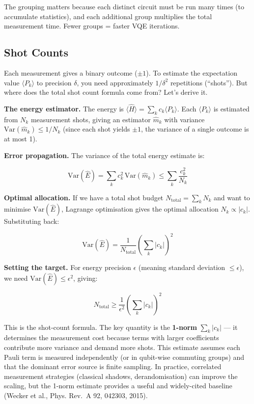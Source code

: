 \documentclass[
  11pt,
  oneside]{book}
\begin{document}
The grouping matters because each distinct circuit must be run many
times (to accumulate statistics), and each additional group multiplies
the total measurement time. Fewer groups = faster VQE iterations.

\subsection{Shot Counts}\label{shot-counts}

Each measurement gives a binary outcome (\(\pm 1\)). To estimate the
expectation value \(\langle P_k \rangle\) to precision \(\delta\), you
need approximately \(1/\delta^2\) repetitions (``shots''). But where
does the total shot count formula come from? Let's derive it.

\textbf{The energy estimator.} The energy is
\(\langle\hat{H}\rangle = \sum_k c_k \langle P_k \rangle\). Each
\(\langle P_k \rangle\) is estimated from \(N_k\) measurement shots,
giving an estimator \(\hat{m}_k\) with variance
\(\text{Var}(\hat{m}_k) \leq 1/N_k\) (since each shot yields \(\pm 1\),
the variance of a single outcome is at most 1).

\textbf{Error propagation.} The variance of the total energy estimate
is:

\[\text{Var}(\hat{E}) = \sum_k c_k^2 \,\text{Var}(\hat{m}_k) \leq \sum_k \frac{c_k^2}{N_k}\]

\textbf{Optimal allocation.} If we have a total shot budget
\(N_\text{total} = \sum_k N_k\) and want to minimise
\(\text{Var}(\hat{E})\), Lagrange optimisation gives the optimal
allocation \(N_k \propto |c_k|\). Substituting back:

\[\text{Var}(\hat{E}) = \frac{1}{N_\text{total}} \left(\sum_k |c_k|\right)^2\]

\textbf{Setting the target.} For energy precision \(\epsilon\) (meaning
standard deviation \(\leq \epsilon\)), we need
\(\text{Var}(\hat{E}) \leq \epsilon^2\), giving:

\[N_\text{total} \geq \frac{1}{\epsilon^2}\left(\sum_k \lvert c_k\rvert\right)^2\]

This is the shot-count formula. The key quantity is the \textbf{1-norm}
\(\sum_k |c_k|\) --- it determines the measurement cost because terms
with larger coefficients contribute more variance and demand more shots.
This estimate assumes each Pauli term is measured independently (or in
qubit-wise commuting groups) and that the dominant error source is
finite sampling. In practice, correlated measurement strategies
(classical shadows, derandomisation) can improve the scaling, but the
1-norm estimate provides a useful and widely-cited baseline (Wecker et
al., Phys. Rev.~A 92, 042303, 2015).
\end{document}
